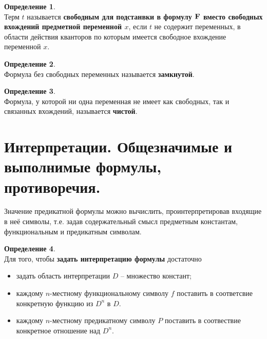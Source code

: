 \documentclass[a4paper,12pt]{article}
\theoremstyle{definition} %
\newtheorem{definition}{Определение}[section]
\theoremstyle{definition} %
\theoremstyle{remark} %
\begin{document}
	\begin{definition}\ \\[1ex]
		Терм $t$ называется \textbf{свободным для подстанвки в формулу $\bf{F}$ вместо свободных вхождений предметной переменной $x$}, если $t$ не содержит переменных, в области действия кванторов по которым имеется свободное вхождение переменной $x$.
	\end{definition}

	\begin{definition}\ \\[1ex]
		Формула без свободных переменных называется \textbf{замкнутой}.
	\end{definition}

	\begin{definition}\ \\[1ex]
		Формула, у которой ни одна переменная не имеет как свободных, так и связанных вхождений, называется \textbf{чистой}.
	\end{definition}

\section{Интерпретации. Общезначимые и выполнимые формулы, противоречия.}
	Значение предикатной формулы можно вычислить, проинтерпретировав входящие в неё символы, т.е. задав содержательный смысл предметным константам, функциональным и предикатным символам.
	
	\begin{definition}\ \\[1ex]
		Для того, чтобы \textbf{задать интерпретацию формулы} достаточно
		\begin{itemize}
			\item задать область интерпретации $D$ -- множество констант;
			\item каждому $n$-местному функциональному символу $f$ поставить в соответсвие конкретную функцию из $D^{n}$ в $D$.
			\item каждому $n$-местному предикатному символу $P$ поставить в соотвествие конкретное отношение над $D^{n}$.
		\end{itemize}
	\end{definition}
\end{document}
